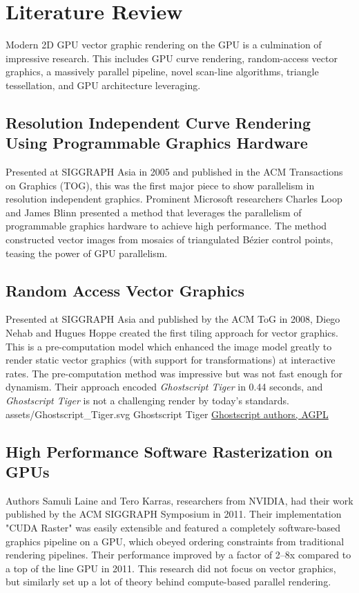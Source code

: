 \section{Literature Review}

Modern 2D GPU vector graphic rendering on the GPU is a culmination of impressive research. This includes GPU curve rendering\cite{Loop05}, random-access vector graphics\cite{Nehab08}, a massively parallel pipeline\cite{Ganacim14}, novel scan-line algorithms\cite{Li16}, triangle tessellation\cite{Silva18}, and GPU architecture leveraging\cite{Levien20}.

\subsection{Resolution Independent Curve Rendering Using Programmable Graphics Hardware\cite{Loop05}}

Presented at SIGGRAPH Asia in 2005 and published in the ACM Transactions on Graphics (TOG), this was the first major piece to show parallelism in resolution independent graphics. Prominent Microsoft researchers Charles Loop and James Blinn presented a method that leverages the parallelism of programmable graphics hardware to achieve high performance. The method constructed vector images from mosaics of triangulated Bézier control points, teasing the power of GPU parallelism.

\subsection{Random Access Vector Graphics\cite{Nehab08}}

Presented at SIGGRAPH Asia and published by the ACM ToG in 2008, Diego Nehab and Hugues Hoppe created the first tiling approach for vector graphics. This is a pre-computation model which enhanced the image model greatly to render static vector graphics (with support for transformations) at interactive rates. The pre-computation method was impressive but was not fast enough for dynamism. Their approach encoded \textit{Ghostscript Tiger} in 0.44 seconds, and \textit{Ghostscript Tiger} is not a challenging render by today's standards.\\

\smallsvg
{assets/Ghostscript_Tiger.svg}
{Ghostscript Tiger}
{\href{http://www.gnu.org/licenses/agpl.html}{Ghostscript authors, AGPL}}

\subsection{High Performance Software Rasterization on GPUs\cite{Laine11}}
Authors Samuli Laine and Tero Karras, researchers from NVIDIA, had their work published by the ACM SIGGRAPH Symposium in 2011. Their implementation "CUDA Raster" was easily extensible and featured a completely software-based graphics pipeline on a GPU, which obeyed ordering constraints from traditional rendering pipelines. Their performance improved by a factor of 2–8x compared to a top of the line GPU in 2011. This research did not focus on vector graphics, but similarly set up a lot of theory behind compute-based parallel rendering.\\

